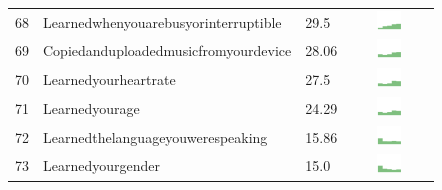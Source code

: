 \documentclass[a4paper,12pt]{article}
\begin{document}
\begin{longtable}{| p{0.5cm} | p{7cm} | p{1cm} | c |}
68 & Learnedwhenyouarebusyorinterruptible & 29.5 & \includegraphics[width = 2cm, height = 0.5cm]{learnedwhenyouarebusyorinterruptiblecombined} \\ 
69 & Copiedanduploadedmusicfromyourdevice & 28.06 & \includegraphics[width = 2cm, height = 0.5cm]{copiedanduploadedmusicfromyourdevicecombined} \\ 
70 & Learnedyourheartrate & 27.5 & \includegraphics[width = 2cm, height = 0.5cm]{learnedyourheartratecombined} \\ 
71 & Learnedyourage & 24.29 & \includegraphics[width = 2cm, height = 0.5cm]{learnedyouragecombined} \\ 
72 & Learnedthelanguageyouwerespeaking & 15.86 & \includegraphics[width = 2cm, height = 0.5cm]{learnedthelanguageyouwerespeakingcombined} \\ 
73 & Learnedyourgender & 15.0 & \includegraphics[width = 2cm, height = 0.5cm]{learnedyourgendercombined} \\ 
\end{longtable}
\end{document}
